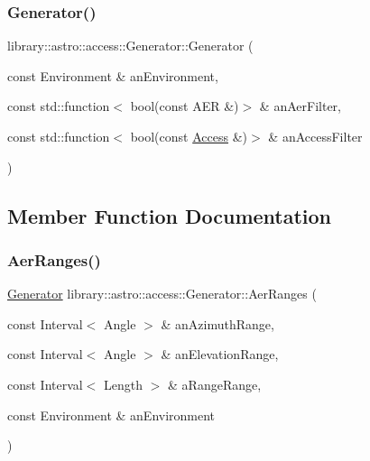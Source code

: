\subsubsection{\texorpdfstring{Generator()}{Generator()}\hspace{0.1cm}{\footnotesize\ttfamily [2/2]}}
{\footnotesize\ttfamily library\+::astro\+::access\+::\+Generator\+::\+Generator (\begin{DoxyParamCaption}\item[{const Environment \&}]{an\+Environment,  }\item[{const std\+::function$<$ bool(const A\+ER \&)$>$ \&}]{an\+Aer\+Filter,  }\item[{const std\+::function$<$ bool(const \hyperlink{classlibrary_1_1astro_1_1_access}{Access} \&)$>$ \&}]{an\+Access\+Filter }\end{DoxyParamCaption})}



\subsection{Member Function Documentation}
\mbox{\label{classlibrary_1_1astro_1_1access_1_1_generator_a51e8191b002ee609db6ce11927281bba}} 
\subsubsection{\texorpdfstring{Aer\+Ranges()}{AerRanges()}}
{\footnotesize\ttfamily \hyperlink{classlibrary_1_1astro_1_1access_1_1_generator}{Generator} library\+::astro\+::access\+::\+Generator\+::\+Aer\+Ranges (\begin{DoxyParamCaption}\item[{const Interval$<$ Angle $>$ \&}]{an\+Azimuth\+Range,  }\item[{const Interval$<$ Angle $>$ \&}]{an\+Elevation\+Range,  }\item[{const Interval$<$ Length $>$ \&}]{a\+Range\+Range,  }\item[{const Environment \&}]{an\+Environment }\end{DoxyParamCaption})\hspace{0.3cm}{\ttfamily [static]}}

